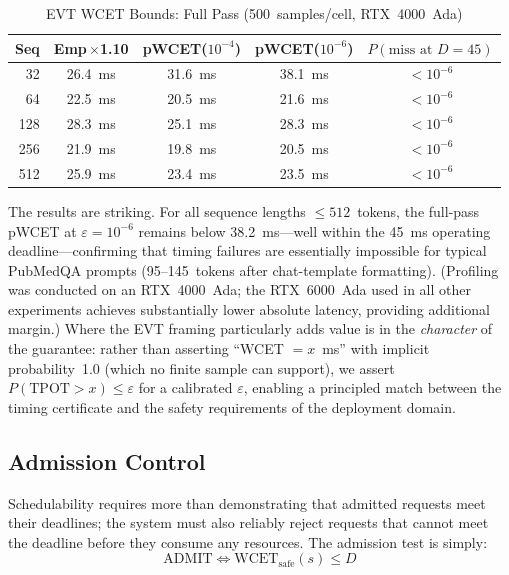 \documentclass[conference]{IEEEtran}
\begin{document}
\begin{table}[htbp]
\caption{EVT WCET Bounds: Full Pass (500~samples/cell, RTX~4000~Ada)}
\centering
\setlength{\tabcolsep}{3pt}
\begin{tabular}{@{}rcccc@{}}
\toprule
\textbf{Seq} & \textbf{Emp\,${\times}$1.10}
             & \textbf{pWCET($10^{-4}$)} & \textbf{pWCET($10^{-6}$)}
             & $P(\text{miss at }D{=}45)$ \\
\midrule
32   & 26.4~ms & 31.6~ms & 38.1~ms & ${<}10^{-6}$ \\
64   & 22.5~ms & 20.5~ms & 21.6~ms & ${<}10^{-6}$ \\
128  & 28.3~ms & 25.1~ms & 28.3~ms & ${<}10^{-6}$ \\
256  & 21.9~ms & 19.8~ms & 20.5~ms & ${<}10^{-6}$ \\
512  & 25.9~ms & 23.4~ms & 23.5~ms & ${<}10^{-6}$ \\
\bottomrule
\end{tabular}
\label{tab:evt}
\end{table}

The results are striking.
For all sequence lengths $\leq 512$~tokens, the full-pass pWCET at
$\varepsilon = 10^{-6}$ remains below 38.2~ms---well within the 45~ms
operating deadline---confirming that timing failures are essentially
impossible for typical PubMedQA prompts (95--145~tokens after
chat-template formatting).
(Profiling was conducted on an RTX~4000~Ada; the RTX~6000~Ada used in
all other experiments achieves substantially lower absolute latency,
providing additional margin.)
Where the EVT framing particularly adds value is in the
\emph{character} of the guarantee: rather than asserting
``WCET $= x$~ms'' with implicit probability~1.0 (which no finite
sample can support), we assert $P(\text{TPOT} > x) \leq \varepsilon$
for a calibrated $\varepsilon$, enabling a principled match between
the timing certificate and the safety requirements of the deployment
domain.

\subsection{Admission Control}

Schedulability requires more than demonstrating that admitted requests
meet their deadlines; the system must also reliably reject requests
that cannot meet the deadline before they consume any resources.
The admission test is simply:
\begin{equation}
\text{ADMIT} \iff \text{WCET}_{\text{safe}}(s) \leq D
\label{eq:admit}
\end{equation}
\end{document}
